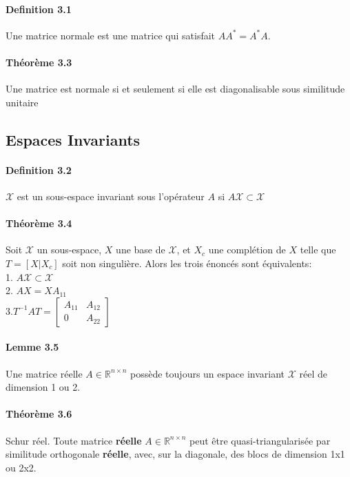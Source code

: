 \paragraph{Definition 3.1} Une matrice normale est une matrice qui satisfait $AA^* = A^* A$.

\paragraph{Théorème 3.3} Une matrice est normale si et seulement si elle est diagonalisable sous similitude unitaire

\subsection{Espaces Invariants}

\paragraph{Definition 3.2} $\mathcal{X}$ est un sous-espace invariant sous l'opérateur $A$ si $A\mathcal{X} \subset \mathcal{X}$

\paragraph{Théorème 3.4} Soit $\mathcal{X}$ un sous-espace, $X$ une base de $\mathcal{X}$, et $X_c$ une complétion de $X$ telle que $T=[X|X_c]$ soit non singulière. Alors les trois énoncés sont équivalents:\\
1. $A\mathcal{X} \subset \mathcal{X}$\\
2. $AX = XA_{11}$\\
3.$ T^{-1}AT = \begin{bmatrix}
A_{11} & A_{12} \\
0 & A_{22}
\end{bmatrix} $

\paragraph{Lemme 3.5} Une matrice réelle $A \in \mathbb{R}^{n\times n}$ possède toujours un espace invariant $\mathcal{X}$ réel de dimension 1 ou 2.

\paragraph{Théorème 3.6} Schur réel. Toute matrice \textbf{réelle} $A\in \mathbb{R}^{n\times n}$ peut être quasi-triangularisée par similitude orthogonale \textbf{réelle}, avec, sur la diagonale, des blocs de dimension 1x1 ou 2x2.

